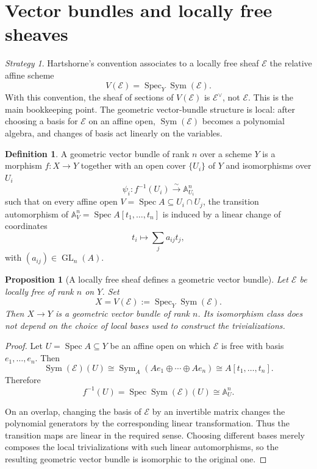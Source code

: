 \documentclass[11pt]{amsart}
\DeclareMathOperator{\Spec}{Spec}
\DeclareMathOperator{\Sym}{Sym}
\newcommand{\E}{\mathscr E}
\theoremstyle{plain}
\newtheorem{proposition}[theorem]{Proposition}
\theoremstyle{definition}
\newtheorem{definition}[theorem]{Definition}
\theoremstyle{remark}
\newtheorem*{strategy}{Strategy}
\begin{document}
\section{Vector bundles and locally free sheaves}

\begin{strategy}
Hartshorne's convention associates to a locally free sheaf $\E$ the relative affine scheme
\[
  V(\E)=\Spec_Y\Sym(\E).
\]
With this convention, the sheaf of sections of $V(\E)$ is $\E^\vee$, not $\E$.  This is the main bookkeeping point.  The geometric vector-bundle structure is local: after choosing a basis for $\E$ on an affine open, $\Sym(\E)$ becomes a polynomial algebra, and changes of basis act linearly on the variables.
\end{strategy}

\begin{definition}
A geometric vector bundle of rank $n$ over a scheme $Y$ is a morphism $f:X\to Y$ together with an open cover $\{U_i\}$ of $Y$ and isomorphisms over $U_i$
\[
  \psi_i:f^{-1}(U_i)\xrightarrow{\sim} \mathbb A^n_{U_i}
\]
such that on every affine open $V=\Spec A\subseteq U_i\cap U_j$, the transition automorphism of $\mathbb A^n_V=\Spec A[t_1,\ldots,t_n]$ is induced by a linear change of coordinates
\[
  t_i\longmapsto \sum_j a_{ij}t_j,
\]
with $(a_{ij})\in \operatorname{GL}_n(A)$.
\end{definition}

\begin{proposition}[A locally free sheaf defines a geometric vector bundle]\label{prop:locfree-to-vectorbundle}
Let $\E$ be locally free of rank $n$ on $Y$.  Set
\[
  X=V(\E):=\Spec_Y\Sym(\E).
\]
Then $X\to Y$ is a geometric vector bundle of rank $n$.  Its isomorphism class does not depend on the choice of local bases used to construct the trivializations.
\end{proposition}

\begin{proof}
Let $U=\Spec A\subseteq Y$ be an affine open on which $\E$ is free with basis $e_1,\ldots,e_n$.  Then
\[
  \Sym(\E)(U)\cong \Sym_A(Ae_1\oplus\cdots\oplus Ae_n)
  \cong A[t_1,\ldots,t_n].
\]
Therefore
\[
  f^{-1}(U)=\Spec\Sym(\E)(U)\cong \mathbb A^n_U.
\]

On an overlap, changing the basis of $\E$ by an invertible matrix changes the polynomial generators by the corresponding linear transformation.  Thus the transition maps are linear in the required sense.  Choosing different bases merely composes the local trivializations with such linear automorphisms, so the resulting geometric vector bundle is isomorphic to the original one.
\end{proof}
\end{document}
